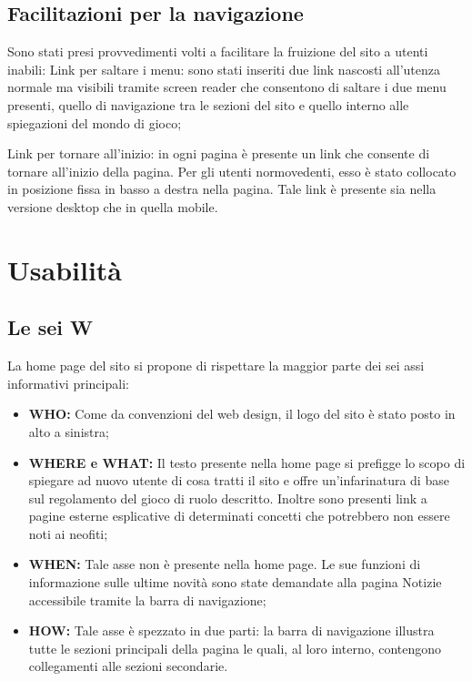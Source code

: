 \documentclass{article}
\begin{document}
\subsection{Facilitazioni per la navigazione}
Sono stati presi provvedimenti volti a facilitare la fruizione del sito a utenti inabili:
		Link per saltare i menu: sono stati inseriti due link nascosti all'utenza normale ma visibili tramite screen reader che consentono di saltare i due menu presenti, quello di navigazione tra le sezioni del sito e quello interno alle spiegazioni del mondo di gioco;
		
		Link per tornare all'inizio: in ogni pagina è presente un link che consente di tornare all'inizio della pagina. Per gli utenti normovedenti, esso è stato collocato in posizione fissa in basso a destra nella pagina. Tale link è presente sia nella versione desktop che in quella mobile.



\section{Usabilità}

\subsection{Le sei W}
La home page del sito si propone di rispettare la maggior parte dei sei assi informativi principali:
\begin{itemize}
\item \textbf{WHO:} Come da convenzioni del web design, il logo del sito è stato posto in alto a sinistra;
\item \textbf{WHERE e WHAT:} Il testo presente nella home page si prefigge lo scopo di spiegare ad nuovo utente di cosa tratti il sito e offre un'infarinatura di base sul regolamento del gioco di ruolo descritto. Inoltre sono presenti link a pagine esterne esplicative di determinati concetti che potrebbero non essere noti ai neofiti;
\item \textbf{WHEN:} Tale asse non è presente nella home page. Le sue funzioni di informazione sulle ultime novità sono state demandate alla pagina Notizie accessibile tramite la barra di navigazione; 
\item \textbf{HOW:} Tale asse è spezzato in due parti: la barra di navigazione illustra tutte le sezioni principali della pagina le quali, al loro interno, contengono collegamenti alle sezioni secondarie.
\end{itemize}
\end{document}
